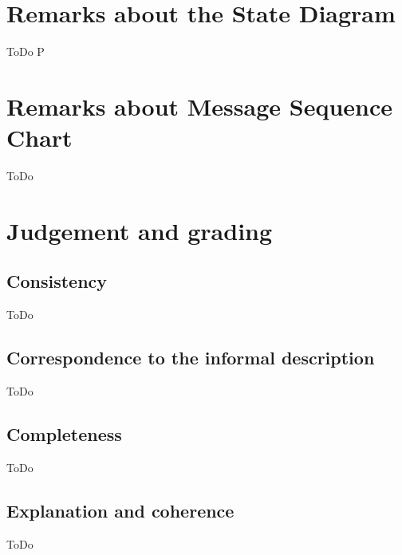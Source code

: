 \documentclass[a4paper,11pt]{article}
\begin{document}
	\section{Remarks about the State Diagram}
    ToDo
P
    \section{Remarks about Message Sequence Chart}
    ToDo

    \section{Judgement and grading}
    \subsection{Consistency}
    ToDo
    
    \subsection{Correspondence to the informal description}
    ToDo
    
    \subsection{Completeness}
    ToDo
    
    \subsection{Explanation and coherence}
    ToDo
\end{document}

